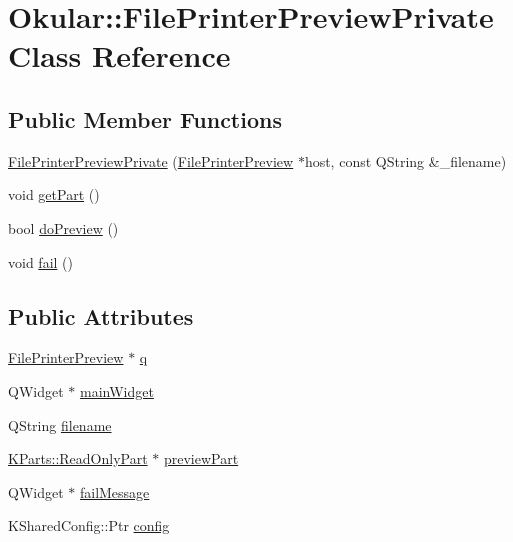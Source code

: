 \hypertarget{classOkular_1_1FilePrinterPreviewPrivate}{\section{Okular\+:\+:File\+Printer\+Preview\+Private Class Reference}
\label{classOkular_1_1FilePrinterPreviewPrivate}
}
\subsection*{Public Member Functions}
\begin{DoxyCompactItemize}
\item 
\hyperlink{classOkular_1_1FilePrinterPreviewPrivate_a3b1e623e825f0075856f9e86b16a5b14}{File\+Printer\+Preview\+Private} (\hyperlink{classOkular_1_1FilePrinterPreview}{File\+Printer\+Preview} $\ast$host, const Q\+String \&\+\_\+filename)
\item 
void \hyperlink{classOkular_1_1FilePrinterPreviewPrivate_ab6b3b5a6370f24c37659fd368204e8be}{get\+Part} ()
\item 
bool \hyperlink{classOkular_1_1FilePrinterPreviewPrivate_a580744cc58ebb9944919312967032fb2}{do\+Preview} ()
\item 
void \hyperlink{classOkular_1_1FilePrinterPreviewPrivate_a239bacdea4d19ee0a7b3c0c9290ede16}{fail} ()
\end{DoxyCompactItemize}
\subsection*{Public Attributes}
\begin{DoxyCompactItemize}
\item 
\hyperlink{classOkular_1_1FilePrinterPreview}{File\+Printer\+Preview} $\ast$ \hyperlink{classOkular_1_1FilePrinterPreviewPrivate_a56292691ae86eccc0845583b01002728}{q}
\item 
Q\+Widget $\ast$ \hyperlink{classOkular_1_1FilePrinterPreviewPrivate_acfd3457414768ef0f6e48a4cb96f21cb}{main\+Widget}
\item 
Q\+String \hyperlink{classOkular_1_1FilePrinterPreviewPrivate_abcf91fd67cbf07a71e6abb5c94b2e946}{filename}
\item 
\hyperlink{classKParts_1_1ReadOnlyPart}{K\+Parts\+::\+Read\+Only\+Part} $\ast$ \hyperlink{classOkular_1_1FilePrinterPreviewPrivate_aa4c0056a7613427e946e5eaede65d432}{preview\+Part}
\item 
Q\+Widget $\ast$ \hyperlink{classOkular_1_1FilePrinterPreviewPrivate_ab0fea736743388ea1d4b80415dee459c}{fail\+Message}
\item 
K\+Shared\+Config\+::\+Ptr \hyperlink{classOkular_1_1FilePrinterPreviewPrivate_aa6b8b7d0af721ba3f6497c3a954c600b}{config}
\end{DoxyCompactItemize}


